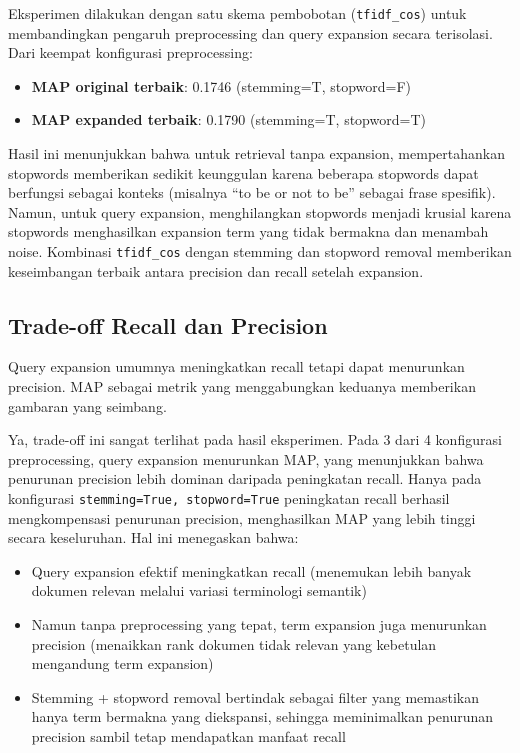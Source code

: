\documentclass[12pt,a4paper]{report}
\begin{document}
Eksperimen dilakukan dengan satu skema pembobotan (\texttt{tfidf\_cos}) untuk membandingkan pengaruh preprocessing dan query expansion secara terisolasi. Dari keempat konfigurasi preprocessing:
\begin{itemize}
    \item \textbf{MAP original terbaik}: 0.1746 (stemming=T, stopword=F)
    \item \textbf{MAP expanded terbaik}: 0.1790 (stemming=T, stopword=T)
\end{itemize}
Hasil ini menunjukkan bahwa untuk retrieval tanpa expansion, mempertahankan stopwords memberikan sedikit keunggulan karena beberapa stopwords dapat berfungsi sebagai konteks (misalnya ``to be or not to be'' sebagai frase spesifik). Namun, untuk query expansion, menghilangkan stopwords menjadi krusial karena stopwords menghasilkan expansion term yang tidak bermakna dan menambah noise. Kombinasi \texttt{tfidf\_cos} dengan stemming dan stopword removal memberikan keseimbangan terbaik antara precision dan recall setelah expansion.

\subsection{Trade-off Recall dan Precision}
Query expansion umumnya meningkatkan recall tetapi dapat menurunkan precision. MAP sebagai metrik yang menggabungkan keduanya memberikan gambaran yang seimbang.

Ya, trade-off ini sangat terlihat pada hasil eksperimen. Pada 3 dari 4 konfigurasi preprocessing, query expansion menurunkan MAP, yang menunjukkan bahwa penurunan precision lebih dominan daripada peningkatan recall. Hanya pada konfigurasi \texttt{stemming=True, stopword=True} peningkatan recall berhasil mengkompensasi penurunan precision, menghasilkan MAP yang lebih tinggi secara keseluruhan. Hal ini menegaskan bahwa:
\begin{itemize}
    \item Query expansion efektif meningkatkan recall (menemukan lebih banyak dokumen relevan melalui variasi terminologi semantik)
    \item Namun tanpa preprocessing yang tepat, term expansion juga menurunkan precision (menaikkan rank dokumen tidak relevan yang kebetulan mengandung term expansion)
    \item Stemming + stopword removal bertindak sebagai filter yang memastikan hanya term bermakna yang diekspansi, sehingga meminimalkan penurunan precision sambil tetap mendapatkan manfaat recall
\end{itemize}
\end{document}
